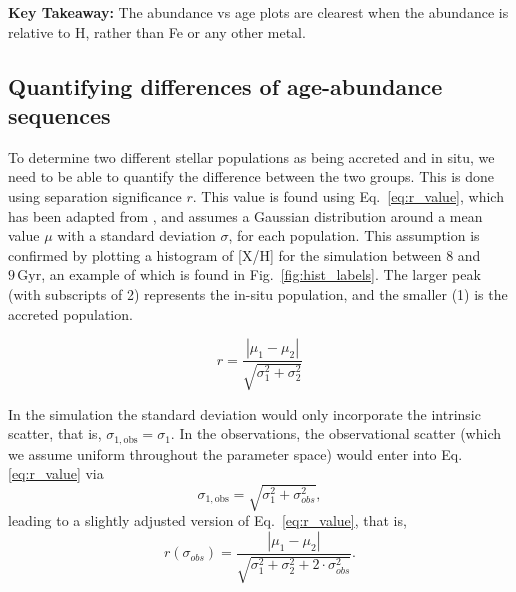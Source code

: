 \documentclass[fleqn,usenatbib]{mnras}
\begin{document}
\par\textbf{Key Takeaway:} The abundance vs age plots are clearest when the abundance is relative to H, rather than Fe or any other metal.


\subsection{Quantifying differences of age-abundance sequences} \label{sec:ageabundance}

To determine two different stellar populations as being accreted and in situ, we need to be able to quantify the difference between the two groups. This is done using separation significance $r$. This value is found using Eq.~\ref{eq:r_value}, which has been adapted from \citet{Lindegren2013}, and assumes a Gaussian distribution around a mean value $\mu$ with a standard deviation $\sigma$, for each population. This assumption is confirmed by plotting a histogram of [X/H] for the simulation between 8 and $9\,\mathrm{Gyr}$, an example of which is found in Fig.~\ref{fig:hist_labels}. The larger peak (with subscripts of 2) represents the in-situ population, and the smaller (1) is the accreted population. 

\begin{equation} \label{eq:r_value}
r = \frac{|\mu_1 - \mu_2|}{\sqrt{\sigma_1^2 + \sigma_2^2}}
\end{equation}

In the simulation the standard deviation would only incorporate the intrinsic scatter, that is, $\sigma_{1,\text{obs}} = \sigma_1$. In the observations, the observational scatter (which we assume uniform throughout the parameter space) would enter into Eq. \ref{eq:r_value} via
\begin{equation} \label{eq:scatter}
    \sigma_{1,\text{obs}} = \sqrt{\sigma_1^2+\sigma_{obs}^2},
\end{equation}
leading to a slightly adjusted version of Eq.~\ref{eq:r_value}, that is,
\begin{equation} \label{eq:r_value_observed}
r (\sigma_{obs}) = \frac{|\mu_1 - \mu_2|}{\sqrt{\sigma_1^2 + \sigma_2^2 + 2\cdot \sigma_{obs}^2}}.
\end{equation}
\end{document}
